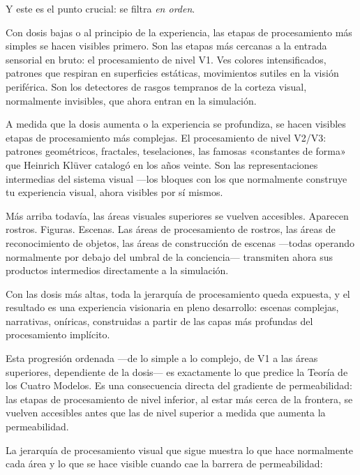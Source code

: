 \documentclass[11pt, twoside, openright]{book}
\begin{document}
Y este es el punto crucial: se filtra \textit{en orden}.

Con dosis bajas o al principio de la experiencia, las etapas de procesamiento más simples se hacen visibles primero. Son las etapas más cercanas a la entrada sensorial en bruto: el procesamiento de nivel V1. Ves colores intensificados, patrones que respiran en superficies estáticas, movimientos sutiles en la visión periférica. Son los detectores de rasgos tempranos de la corteza visual, normalmente invisibles, que ahora entran en la simulación.

A medida que la dosis aumenta o la experiencia se profundiza, se hacen visibles etapas de procesamiento más complejas. El procesamiento de nivel V2/\allowbreak{}V3: patrones geométricos, fractales, teselaciones, las famosas «constantes de forma» que Heinrich Klüver catalogó en los años veinte. Son las representaciones intermedias del sistema visual ---los bloques con los que normalmente construye tu experiencia visual, ahora visibles por sí mismos.

Más arriba todavía, las áreas visuales superiores se vuelven accesibles. Aparecen rostros. Figuras. Escenas. Las áreas de procesamiento de rostros, las áreas de reconocimiento de objetos, las áreas de construcción de escenas ---todas operando normalmente por debajo del umbral de la conciencia--- transmiten ahora sus productos intermedios directamente a la simulación.

Con las dosis más altas, toda la jerarquía de procesamiento queda expuesta, y el resultado es una experiencia visionaria en pleno desarrollo: escenas complejas, narrativas, oníricas, construidas a partir de las capas más profundas del procesamiento implícito.

Esta progresión ordenada ---de lo simple a lo complejo, de V1 a las áreas superiores, dependiente de la dosis--- es exactamente lo que predice la Teoría de los Cuatro Modelos. Es una consecuencia directa del gradiente de permeabilidad: las etapas de procesamiento de nivel inferior, al estar más cerca de la frontera, se vuelven accesibles antes que las de nivel superior a medida que aumenta la permeabilidad.

La jerarquía de procesamiento visual que sigue muestra lo que hace normalmente cada área y lo que se hace visible cuando cae la barrera de permeabilidad:
\end{document}
